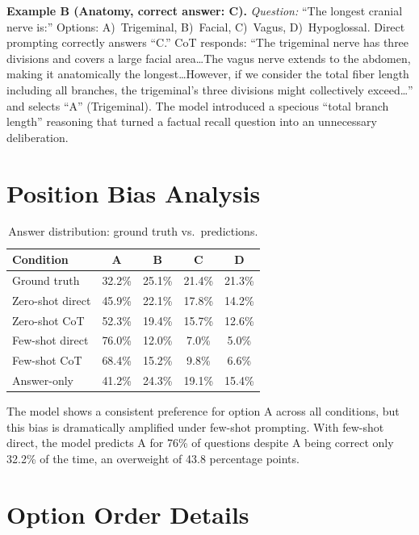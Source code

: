 \documentclass[runningheads,a4paper]{llncs}
\begin{document}
\smallskip\noindent\textbf{Example B (Anatomy, correct answer: C).}
\textit{Question:} ``The longest cranial nerve is:''
Options: A)~Trigeminal, B)~Facial, C)~Vagus, D)~Hypoglossal.
Direct prompting correctly answers ``C.'' CoT responds: ``The trigeminal nerve has three divisions and covers a large facial area\ldots The vagus nerve extends to the abdomen, making it anatomically the longest\ldots However, if we consider the total fiber length including all branches, the trigeminal's three divisions might collectively exceed\ldots'' and selects ``A'' (Trigeminal). The model introduced a specious ``total branch length'' reasoning that turned a factual recall question into an unnecessary deliberation.

\section{Position Bias Analysis}\label{app:bias}

\begin{table}[t]
\centering
\caption{Answer distribution: ground truth vs.\ predictions.}
\label{tab:position_dist}
\begin{tabular}{lcccc}
\toprule
\textbf{Condition} & \textbf{A} & \textbf{B} & \textbf{C} & \textbf{D} \\
\midrule
Ground truth & 32.2\% & 25.1\% & 21.4\% & 21.3\% \\
\midrule
Zero-shot direct & 45.9\% & 22.1\% & 17.8\% & 14.2\% \\
Zero-shot CoT & 52.3\% & 19.4\% & 15.7\% & 12.6\% \\
Few-shot direct & 76.0\% & 12.0\% & 7.0\% & 5.0\% \\
Few-shot CoT & 68.4\% & 15.2\% & 9.8\% & 6.6\% \\
Answer-only & 41.2\% & 24.3\% & 19.1\% & 15.4\% \\
\bottomrule
\end{tabular}
\end{table}

The model shows a consistent preference for option A across all conditions, but this bias is dramatically amplified under few-shot prompting. With few-shot direct, the model predicts A for 76\% of questions despite A being correct only 32.2\% of the time, an overweight of 43.8 percentage points.

\section{Option Order Details}\label{app:order}
\end{document}
